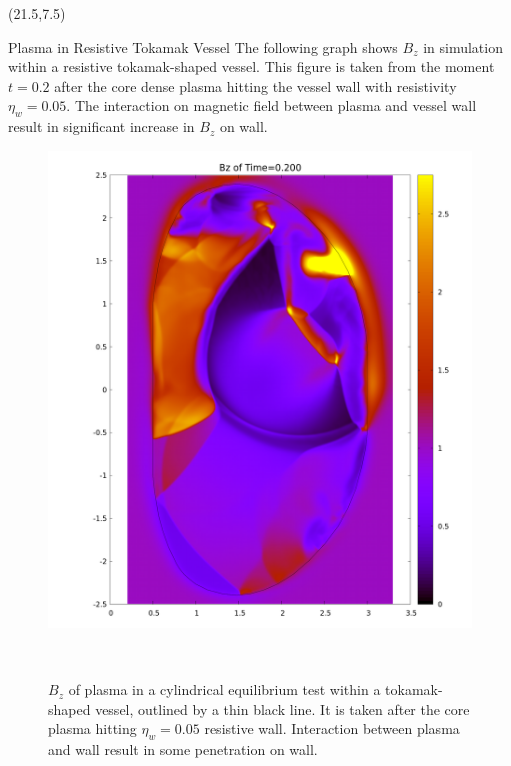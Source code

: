 \documentclass[final]{beamer}
\begin{document}
\begin{frame}{}
\begin{textblock}{19.5}(21.5,7.5)
\begin{block}{Plasma in Resistive Tokamak Vessel}
The following graph shows $B_z$ in simulation within a resistive tokamak-shaped vessel. This figure is taken from the moment $t=0.2$ after the core dense plasma hitting the vessel wall with resistivity $\eta_w=0.05$. The interaction on magnetic field between plasma and vessel wall result in significant increase in $B_z$ on wall.\\
\begin{figure}
\begin{minipage}{0.90\linewidth}
\includegraphics[width = \linewidth]{Poster_Bz_100.png}
\end{minipage}\\
\begin{minipage}{0.95\linewidth}
\caption{$B_z$ of plasma in a cylindrical equilibrium test within a tokamak-shaped vessel, outlined by a thin black line. It is taken after the core plasma hitting $\eta_{w}=0.05$ resistive wall. Interaction between plasma and wall result in some penetration on wall.}
\label{fig:CoffeeFig}
\end{minipage}
\end{figure}
\end{block}


\end{textblock}
\end{frame}
\end{document}
